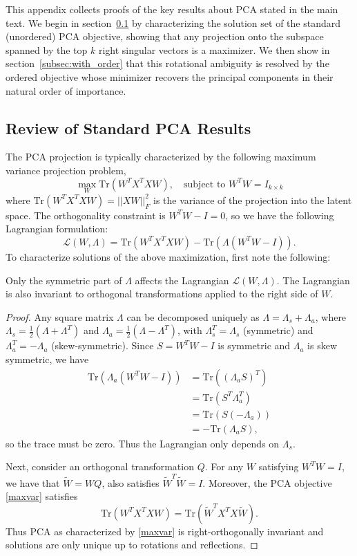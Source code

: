 \documentclass[twoside,11pt]{article}
\begin{document}
This appendix collects proofs of the key results about PCA stated in the main text. We begin in section~\ref{subsec:no_order} by characterizing the solution set of the standard (unordered) PCA objective, showing that any projection onto the subspace spanned by the top $k$ right singular vectors is a maximizer. We then show in section~\ref{subsec:with_order} that this rotational ambiguity is resolved by the ordered objective whose minimizer recovers the principal components in their natural order of importance.


\subsection{Review of Standard PCA Results}
\label{subsec:no_order}

The PCA projection is typically characterized by the following maximum variance projection problem,
\begin{equation}\label{maxvar} \max_W  \text{Tr}(W^T X^T X W), \quad \text{subject to  } W^T W = I_{k\times k}\end{equation}
where $\text{Tr}(W^T X^T X W) = ||XW||_F^2$ is the variance of the projection into the latent space.  
The orthogonality constraint is $W^TW - I = 0$, so we have the following Lagrangian formulation:
  \[\mathcal{L}(W,\Lambda) = \text{Tr}(W^TX^TXW) - \text{Tr}(\Lambda(W^TW-I)).\]  
To characterize solutions of the above maximization, first note the following:
\begin{lemma}
    Only the symmetric part of $\Lambda$ affects the Lagrangian $\mathcal{L}(W,\Lambda)$.  The Lagrangian is also invariant to orthogonal transformations applied to the right side of $W$.
\end{lemma}

\begin{proof}
    Any square matrix $\Lambda$ can be decomposed uniquely as $\Lambda = \Lambda_s+\Lambda_a$, where $\Lambda_s = \frac{1}{2}(\Lambda+\Lambda^T)$ and $\Lambda_a = \frac{1}{2}(\Lambda-\Lambda^T)$, with $\Lambda_s^T = \Lambda_s$ (symmetric) and $\Lambda_a^T = -\Lambda_a$ (skew-symmetric). Since $S = W^TW-I$ is symmetric and $\Lambda_a$ is skew symmetric, we have
    \begin{align*}
        \text{Tr}(\Lambda_a(W^TW-I)) &= \text{Tr}((\Lambda_aS)^T)\\&= \text{Tr}(S^T\Lambda_a^T)\\&=
        \text{Tr}(S(-\Lambda_a))\\&=
        -\text{Tr}(\Lambda_aS),
    \end{align*}
so the trace must be zero. Thus the Lagrangian only depends on $\Lambda_s$.

Next, consider an orthogonal transformation $Q$. For any $W$ satisfying $W^TW = I$, we have that $\tilde W = WQ$, also satisfies $\tilde W^T\tilde W = I$. Moreover, the PCA objective \eqref{maxvar} satisfies
\[\text{Tr}(W^TX^TXW) = \text{Tr}(\tilde W^TX^TX\tilde W).\]
Thus PCA as characterized by \eqref{maxvar} is right-orthogonally invariant and solutions are only unique up to rotations and reflections.
\end{proof}
\end{document}

